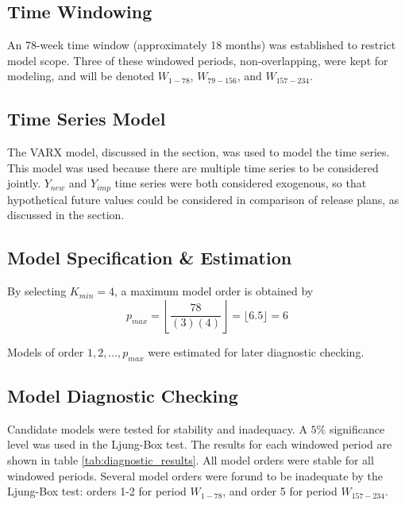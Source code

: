 \documentclass[a4paper]{scrartcl}
\begin{document}
\subsection*{Time Windowing}
An 78-week time window (approximately 18 months) was established to restrict model scope. Three of these windowed periods, non-overlapping, were kept for modeling, and will be denoted $W_{1-78}$, $W_{79-156}$, and $W_{157-234}$.

\subsection*{Time Series Model}

The VARX model, discussed in the  section, was used to model the time series. This model was used because there are multiple time series to be considered jointly. $Y_{new}$ and $Y_{imp}$ time series were both considered exogenous, so that hypothetical future values could be considered in comparison of release plans, as discussed in the  section.

\subsection*{Model Specification \& Estimation}

By selecting $K_{min} = 4$, a maximum model order is obtained by
\begin{equation}
p_{max} = \left \lfloor \frac{78}{(3)(4)} \right \rfloor = \lfloor 6.5 \rfloor = 6
\end{equation}

Models of order $1,2,...,p_{max}$ were estimated for later diagnostic checking.

\subsection*{Model Diagnostic Checking}

Candidate models were tested for stability and inadequacy. A $5\%$ significance level was used in the Ljung-Box test. The results for each windowed period are shown in table \ref{tab:diagnostic_results}. All model orders were stable for all windowed periods. Several model orders were forund to be inadequate by the Ljung-Box test: orders 1-2 for period $W_{1-78}$, and order 5 for period $W_{157-234}$.
\end{document}
